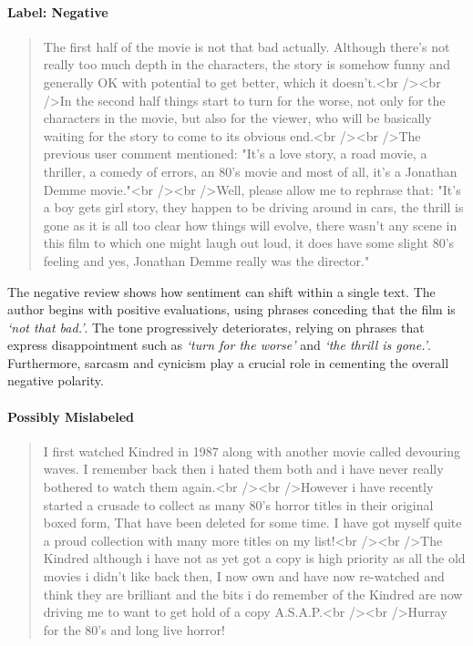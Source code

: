 \documentclass[a4paper,fleqn]{cas-dc}
\newcommand{\literal}[1]{\textit{`#1'}}
\begin{document}
\paragraph{Label: Negative}

\begin{quote}	
	The first half of the movie is not that bad actually. Although there's not really too much depth in the characters, the story is somehow funny and generally OK with potential to get better, which it doesn't.<br /><br />In the second half things start to turn for the worse, not only for the characters in the movie, but also for the viewer, who will be basically waiting for the story to come to its obvious end.<br /><br />The previous user comment mentioned: "It's a love story, a road movie, a thriller, a comedy of errors, an 80's movie and most of all, it's a Jonathan Demme movie."<br /><br />Well, please allow me to rephrase that: "It's a boy gets girl story, they happen to be driving around in cars, the thrill is gone as it is all too clear how things will evolve, there wasn't any scene in this film to which one might laugh out loud, it does have some slight 80's feeling and yes, Jonathan Demme really was the director."
\end{quote}

The negative review shows how sentiment can shift within a single text. The author begins with positive evaluations, using phrases conceding that the film is \literal{not that bad.}. The tone progressively deteriorates, relying on phrases that express disappointment such as \literal{turn for the worse} and \literal{the thrill is gone.}. Furthermore, sarcasm and cynicism play a crucial role in cementing the overall negative polarity.

\paragraph{Possibly Mislabeled}

\begin{quote}
	I first watched Kindred in 1987 along with another movie called devouring waves. I remember back then i hated them both and i have never really bothered to watch them again.<br /><br />However i have recently started a crusade to collect as many 80's horror titles in their original boxed form, That have been deleted for some time. I have got myself quite a proud collection with many more titles on my list!<br /><br />The Kindred although i have not as yet got a copy is high priority as all the old movies i didn't like back then, I now own and have now re-watched and think they are brilliant and the bits i do remember of the Kindred are now driving me to want to get hold of a copy A.S.A.P.<br /><br />Hurray for the 80's and long live horror!
\end{quote}
\end{document}
